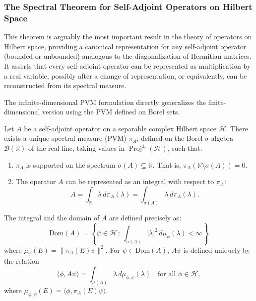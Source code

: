 \subsubsection{The Spectral Theorem for Self-Adjoint Operators on Hilbert Space}
\label{subsec:spectral_theorem_hilbert}

This theorem is arguably the most important result in the theory of operators on Hilbert space, providing a canonical representation for any self-adjoint operator (bounded or unbounded) analogous to the diagonalization of Hermitian matrices. It asserts that every self-adjoint operator can be represented as multiplication by a real variable, possibly after a change of representation, or equivalently, can be reconstructed from its spectral measure.

The infinite-dimensional PVM formulation directly generalizes the finite-dimensional version using the PVM defined on Borel sets.

\begin{theorem}
\label{thm:spectral_pvm}
Let $A$ be a self-adjoint operator on a separable complex Hilbert space $\mathcal{H}$. There exists a unique spectral measure (PVM) $\pi_A$, defined on the Borel $\sigma$-algebra $\mathcal{B}(\mathbb{R})$ of the real line, taking values in $\operatorname{Proj}^{\perp}(\mathcal{H})$, such that:
\begin{enumerate}
    \item $\pi_A$ is supported on the spectrum $\sigma(A) \subseteq \mathbb{R}$. That is, $\pi_A(\mathbb{R} \setminus \sigma(A)) = 0$.
    \item The operator $A$ can be represented as an integral with respect to $\pi_A$:
    \begin{equation} \label{eq:spectral_integral_pvm}
    A = \int_{\mathbb{R}} \lambda \, d\pi_A(\lambda) = \int_{\sigma(A)} \lambda \, d\pi_A(\lambda).
    \end{equation}
\end{enumerate}
The integral and the domain of $A$ are defined precisely as:
\[ \text{Dom}(A) = \left\{ \psi \in \mathcal{H} \,:\, \int_{\sigma(A)} |\lambda|^2 \, d\mu_\psi(\lambda) < \infty \right\} \]
where $\mu_\psi(E) = \|\pi_A(E)\psi\|^2$. For $\psi \in \text{Dom}(A)$, $A\psi$ is defined uniquely by the relation
\[ \langle \phi, A\psi \rangle = \int_{\sigma(A)} \lambda \, d\mu_{\phi,\psi}(\lambda) \quad \text{for all } \phi \in \mathcal{H}, \]
where $\mu_{\phi,\psi}(E) = \langle \phi, \pi_A(E)\psi \rangle$.
\end{theorem}


